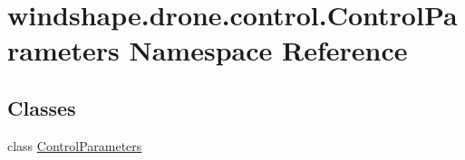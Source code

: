 \hypertarget{namespacewindshape_1_1drone_1_1control_1_1_control_parameters}{}\section{windshape.\+drone.\+control.\+Control\+Parameters Namespace Reference}
\label{namespacewindshape_1_1drone_1_1control_1_1_control_parameters}
\subsection*{Classes}
\begin{DoxyCompactItemize}
\item 
class \mbox{\hyperlink{classwindshape_1_1drone_1_1control_1_1_control_parameters_1_1_control_parameters}{Control\+Parameters}}
\end{DoxyCompactItemize}
